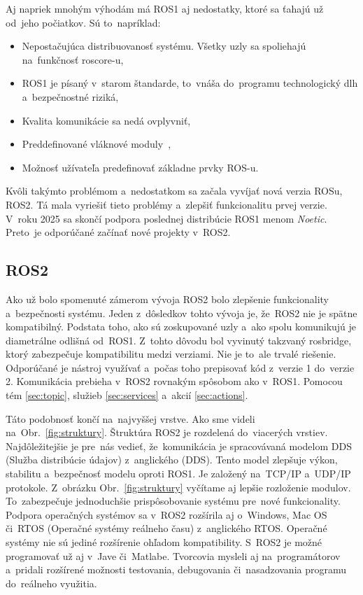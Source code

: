 Aj napriek mnohým výhodám má ROS1 aj nedostatky, ktoré sa ťahajú už od~jeho počiatkov. Sú to~napríklad:

\begin{itemize}
	\item Nepostačujúca distribuovanosť systému. Všetky uzly sa spoliehajú na~funkčnosť roscore-u,
	\item ROS1 je písaný v~starom štandarde, to~vnáša do~programu technologický dlh a~bezpečnostné riziká,
	\item Kvalita komunikácie sa nedá ovplyvniť,
	\item Preddefinované vláknové moduly~\cite{ROS2design},
	\item Možnosť užívateľa predefinovať základne prvky ROS-u.
\end{itemize}

Kvôli takýmto problémom a~nedostatkom sa začala vyvíjať nová verzia ROSu, ROS2. Tá mala vyriešiť tieto problémy a~zlepšiť funkcionalitu
prvej verzie. V~roku 2025 sa skončí podpora poslednej distribúcie ROS1 menom \textit{Noetic}. Preto~je odporúčané začínať nové projekty
v~ROS2.

\subsection{ROS2}

Ako už bolo spomenuté zámerom vývoja ROS2 bolo zlepšenie funkcionality a~bezpečnosti systému. Jeden z~dôsledkov tohto vývoja je, že~ROS2
nie je spätne kompatibilný. Podstata toho, ako sú zoskupované uzly a~ako spolu komunikujú je diametrálne odlišná od~ROS1. Z~tohto dôvodu
bol vyvinutý takzvaný rosbridge, ktorý zabezpečuje kompatibilitu medzi verziami. Nie je to~ale trvalé riešenie. Odporúčané je nástroj
využívať a~počas toho prepisovať kód z~verzie 1 do~verzie 2. Komunikácia prebieha v~ROS2 rovnakým spôsobom ako v~ROS1. Pomocou tém
\ref{sec:topic}, služieb \ref{sec:services} a~akcií \ref{sec:actions}.

Táto podobnosť končí na~najvyššej vrstve. Ako sme videli na~Obr.~\ref{fig:struktury}. Štruktúra ROS2 je rozdelená do~viacerých vrstiev.
Najdôležitejšie je pre~nás vedieť, že~komunikácia je spracovávaná modelom DDS (Služba distribúcie údajov) z~anglického (\acrlong{DDS}). Tento
model zlepšuje výkon, stabilitu a~bezpečnosť modelu oproti ROS1. Je založený na~TCP/IP a~UDP/IP protokole. Z~obrázku Obr.~\ref{fig:struktury}
vyčítame aj lepšie rozloženie modulov. To~zabezpečuje jednoduchšie prispôsobovanie systému pre~nové funkcionality. Podpora operačných systémov
sa v~ROS2 rozšírila aj o~Windows, Mac OS či~RTOS (Operačné systémy reálneho času) z~anglického \acrlong{RTOS}. Operačné systémy nie sú jediné
rozšírenie ohľadom kompatibility. S~ROS2 je možné programovať už aj v~Jave či~Matlabe. Tvorcovia mysleli aj na~programátorov a~pridali rozšírené
možnosti testovania, debugovania či~nasadzovania programu do~reálneho využitia.

